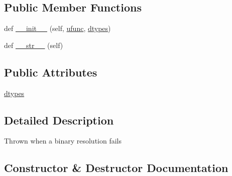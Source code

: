 \subsection*{Public Member Functions}
\begin{DoxyCompactItemize}
\item 
def \hyperlink{classnumpy_1_1core_1_1__exceptions_1_1__UFuncBinaryResolutionError_afbbb6dca676466b48ce6707925ff43d8}{\+\_\+\+\_\+init\+\_\+\+\_\+} (self, \hyperlink{classnumpy_1_1core_1_1__exceptions_1_1UFuncTypeError_a10866e4bfc9971e5aa77e8cd1c9e04f4}{ufunc}, \hyperlink{classnumpy_1_1core_1_1__exceptions_1_1__UFuncBinaryResolutionError_ab4d718159faec93fa08762d6ad0b1c93}{dtypes})
\item 
def \hyperlink{classnumpy_1_1core_1_1__exceptions_1_1__UFuncBinaryResolutionError_a204ebb2b1c7213e909e9c9c0c5ba263f}{\+\_\+\+\_\+str\+\_\+\+\_\+} (self)
\end{DoxyCompactItemize}
\subsection*{Public Attributes}
\begin{DoxyCompactItemize}
\item 
\hyperlink{classnumpy_1_1core_1_1__exceptions_1_1__UFuncBinaryResolutionError_ab4d718159faec93fa08762d6ad0b1c93}{dtypes}
\end{DoxyCompactItemize}


\subsection{Detailed Description}
\begin{DoxyVerb}Thrown when a binary resolution fails \end{DoxyVerb}
 

\subsection{Constructor \& Destructor Documentation}
\mbox{\label{classnumpy_1_1core_1_1__exceptions_1_1__UFuncBinaryResolutionError_afbbb6dca676466b48ce6707925ff43d8}} 
